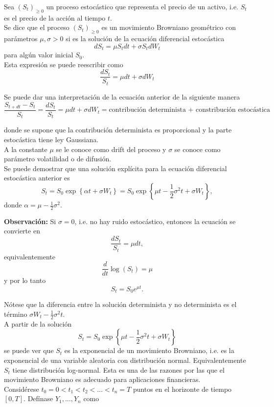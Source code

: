 \documentclass[11pt]{article}
\begin{document}
Sea $(S_t)_{\geq 0}$ un proceso estocástico que representa el precio de un activo, i.e. $S_t$ es el precio de la acción al tiempo $t$.\\
	
Se dice que el proceso $(S_t)_{\geq 0}$ es un movimiento Browniano geométrico con parámetros $\mu,\sigma>0$ si es la solución de la ecuación diferencial estocástica $$dS_t = \mu S_t dt + \sigma S_t dW_t$$ para algún valor inicial $S_0$.\\
	
Esta expresión se puede reescribir como $$\frac{dS_t}{S_t} = \mu dt + \sigma dW_t$$
	
Se puede dar una interpretación de la ecuación anterior de la siguiente manera 
$$\frac{S_{t+dt}-S_t}{S_t}=\frac{dS_t}{S_t} = \mu dt + \sigma dW_t = 
\mbox{contribución determinista + constribución estocástica}$$
	
donde se supone que la contribución determinista es proporcional y la parte estocástica tiene ley Gaussiana.\\
	
A la constante $\mu$ se le conoce como drift del proceso y $\sigma$ se conoce  como parámetro volatilidad o de difusión.\\
	
Se puede demostrar que una solución explícita para la ecuación diferencial estocástica anterior es 
$$S_t =  S_0 \exp\left\{\alpha t + \sigma W_t\right\} = S_0 \exp\left\{\mu t -\frac{1}{2}\sigma^2t + \sigma W_t\right\},$$ donde $\alpha = \mu-\frac{1}{2}\sigma^2$.
	
\textbf{Observación:}
Si $\sigma = 0$, i.e. no hay ruido estocástico, entonces la ecuación se convierte en 
$$\frac{dS_t}{S_t} = \mu dt,$$ 
equivalentemente $$\frac{d}{dt}\log(S_t) = \mu$$
y por lo tanto $$S_t = S_0 e^{\mu t}.$$
	
Nótese que la diferencia entre la solución determinista y no determinista es el término $\sigma W_t-\frac{1}{2}\sigma^2t$.\\
	
A partir de la solución $$S_t = S_0 \exp\left\{\mu t -\frac{1}{2}\sigma^2t + \sigma W_t\right\}$$ 
se puede ver que $S_t$ es la exponencial de un movimiento Browniano,  i.e. es la exponencial de una variable aleatoria con distribución normal. 
Equivalentemente $S_t$ tiene distribución log-normal. 
Esta es una de las razones por las que el movimiento Browniano es adecuado para aplicaciones financieras.\\
	
Considérese $t_0=0 < t_1 < t_2 <\ldots<t_n=T$ puntos en el horizonte de tiempo $[0,T]$. Defínase $Y_1,\ldots,Y_n$ como
	
\end{document}
